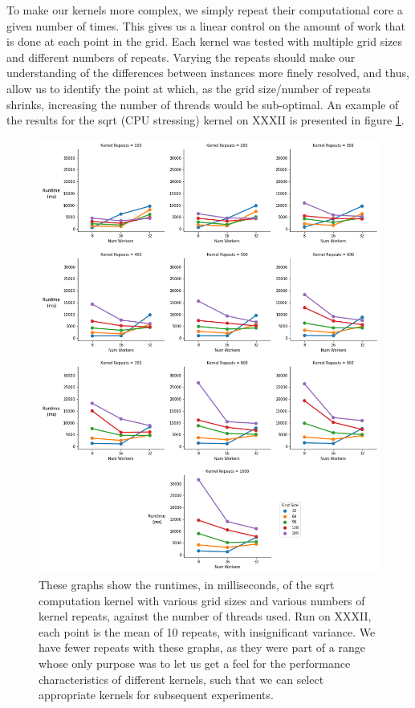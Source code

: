 To make our kernels more complex, we simply repeat their computational core a given number of times. This gives us a linear control on the amount of work that is done at each point in the grid. Each kernel was tested with multiple grid sizes and different numbers of repeats. Varying the repeats should make our understanding of the differences between instances more finely resolved, and thus, allow us to identify the point at which, as the grid size/number of repeats shrinks, increasing the number of threads would be sub-optimal. An example of the results for the sqrt (CPU stressing) kernel on XXXII is presented in figure \ref{fig:focustest3}.



\begin{figure}[H]
    \vspace*{-1.5in}
    \centerline{\includegraphics[width=1.3\textwidth]{graphics/interesting_instances/focustest3_2.png}}
    \caption{These graphs show the runtimes, in milliseconds, of the sqrt computation kernel with various grid sizes and various numbers of kernel repeats, against the number of threads used. Run on XXXII, each point is the mean of 10 repeats, with insignificant variance. We have fewer repeats with these graphs, as they were part of a range whose only purpose was to let us get a feel for the performance characteristics of different kernels, such that we can select appropriate kernels for subsequent experiments.}
    \label{fig:focustest3}
\end{figure}




